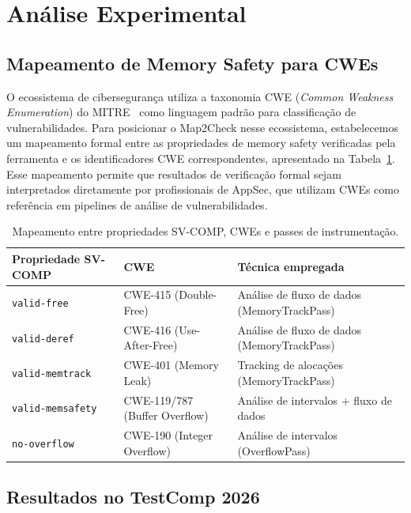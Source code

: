 \documentclass[12pt]{article}
\begin{document}
\section{Análise Experimental}
\label{sec:ciberseguranca}

\subsection{Mapeamento de Memory Safety para CWEs}
\label{subsec:cwe}

O ecossistema de cibersegurança utiliza a taxonomia CWE (\textit{Common Weakness Enumeration}) do MITRE~\cite{cwe2025} como linguagem padrão para classificação de vulnerabilidades. Para posicionar o Map2Check nesse ecossistema, estabelecemos um mapeamento formal entre as propriedades de memory safety verificadas pela ferramenta e os identificadores CWE correspondentes, apresentado na Tabela~\ref{tab:cwe}. Esse mapeamento permite que resultados de verificação formal sejam interpretados diretamente por profissionais de AppSec, que utilizam CWEs como referência em pipelines de análise de vulnerabilidades.

\begin{table}[ht]
\centering
\caption{Mapeamento entre propriedades SV-COMP, CWEs e passes de instrumentação.}
\label{tab:cwe}
\begin{tabularx}{\textwidth}{@{}ll>{\raggedright\arraybackslash}X@{}}
\toprule
Propriedade SV-COMP & CWE & Técnica empregada \\
\midrule
\texttt{valid-free} & CWE-415 (Double-Free) & Análise de fluxo de dados (MemoryTrackPass) \\
\texttt{valid-deref} & CWE-416 (Use-After-Free) & Análise de fluxo de dados (MemoryTrackPass) \\
\texttt{valid-memtrack} & CWE-401 (Memory Leak) & Tracking de alocações (MemoryTrackPass) \\
\texttt{valid-memsafety} & CWE-119/787 (Buffer Overflow) & Análise de intervalos + fluxo de dados \\
\texttt{no-overflow} & CWE-190 (Integer Overflow) & Análise de intervalos (OverflowPass) \\
\bottomrule
\end{tabularx}
\end{table}

\subsection{Resultados no TestComp 2026}
\label{subsec:testcomp}
\end{document}
